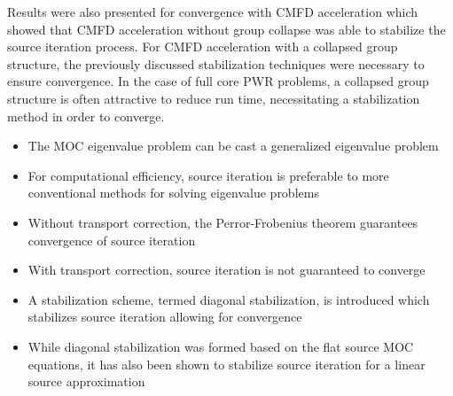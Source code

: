 Results were also presented for convergence with \ac{CMFD} acceleration which showed that \ac{CMFD} acceleration without group collapse was able to stabilize the source iteration process. For \ac{CMFD} acceleration with a collapsed group structure, the previously discussed stabilization techniques were necessary to ensure convergence. In the case of full core \ac{PWR} problems, a collapsed group structure is often attractive to reduce run time, necessitating a stabilization method in order to converge.


\vfill
\begin{highlightsbox}[frametitle=Highlights]
	\begin{itemize}
		
		\item The \ac{MOC} eigenvalue problem can be cast a generalized eigenvalue problem
		
		\item For computational efficiency, source iteration is preferable to more conventional methods for solving eigenvalue problems
		
		\item Without transport correction, the Perror-Frobenius theorem guarantees convergence of source iteration
		
		\item With transport correction, source iteration is not guaranteed to converge
		
		\item A stabilization scheme, termed diagonal stabilization, is introduced which stabilizes source iteration allowing for convergence
		
		\item While diagonal stabilization was formed based on the flat source \ac{MOC} equations, it has also been shown to stabilize source iteration for a linear source approximation
		
	\end{itemize}
\end{highlightsbox}
\vfill